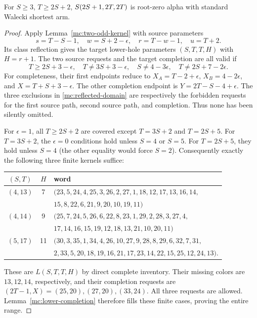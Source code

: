 \begin{lemma}
\label{mc:oee-repeated-large}
For $S\ge3$, $T\ge2S+2$, $S\!\left(2S+1,2T,2T\right)$ is root-zero
alpha with standard Walecki shortest arm.
\end{lemma}
\begin{proof}
Apply Lemma~\ref{mc:two-odd-kernel} with source parameters
\[
 s=T-S-1,\quad w=S+2-\epsilon,\quad r=T-w-1,
 \quad u=T+2.
\]
Its class reflection gives the target lower-hole parameters
$(S,T,T,H)$ with $H=r+1$.
The two source requests and the target completion are all valid if
\begin{equation}\label{mc:reflected-domain}
 T\ge2S+3-\epsilon,\quad T\ne3S+3-\epsilon,\quad
 S\ne4-3\epsilon,\quad T\ne2S+7-2\epsilon.
\end{equation}
For completeness, their first endpoints reduce to
$X_A=T-2+\epsilon$, $X_B=4-2\epsilon$, and
$X=T+S+3-\epsilon$.  The other completion endpoint is
$Y=2T-S-4+\epsilon$.
The three exclusions in \eqref{mc:reflected-domain} are respectively
the forbidden requests for the first source path, second source path,
and completion.  Thus none has been silently omitted.

For $\epsilon=1$, all $T\ge2S+2$ are covered except
$T=3S+2$ and $T=2S+5$.  For $T=3S+2$, the $\epsilon=0$
conditions hold unless $S=4$ or $S=5$.  For $T=2S+5$, they
hold unless $S=4$ (the other equality would force $S=2$).
Consequently exactly the following three finite kernels suffice:
\begin{center}\small
\begin{tabular}{ccl}
$(S,T)$&$H$&word\\\midrule
$(4,13)$&7&$(23,5,24,4,25,3,26,2,27,1,18,12,17,13,16,14,$\\
&&$15,8,22,6,21,9,20,10,19,11)$\\
$(4,14)$&9&$(25,7,24,5,26,6,22,8,23,1,29,2,28,3,27,4,$\\
&&$17,14,16,15,19,12,18,13,21,10,20,11)$\\
$(5,17)$&11&$(30,3,35,1,34,4,26,10,27,9,28,8,29,6,32,7,31,$\\
&&$2,33,5,20,18,19,16,21,17,23,14,22,15,25,12,24,13)$.
\end{tabular}\end{center}
These are $L(S,T,T,H)$ by direct complete inventory.
Their missing colors are $13,12,14$, respectively, and their
completion requests are $(2T-1,X)=(25,20),(27,20),(33,24)$.
All three requests are allowed.  Lemma~\ref{mc:lower-completion}
therefore fills these finite cases, proving the entire range.
\end{proof}

